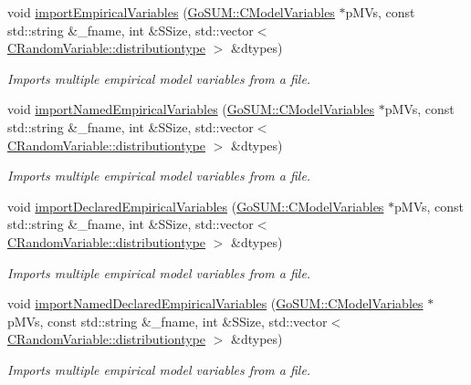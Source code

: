 \begin{DoxyCompactItemize}
void \hyperlink{class_go_s_u_m_1_1_c_container_ae5c4eeb98b818af39fd6956f0cc52757}{import\-Empirical\-Variables} (\hyperlink{class_go_s_u_m_1_1_c_model_variables}{Go\-S\-U\-M\-::\-C\-Model\-Variables} $\ast$p\-M\-Vs, const std\-::string \&\-\_\-fname, int \&S\-Size, std\-::vector$<$ \hyperlink{class_c_random_variable_a80d2a87c43847274138b51f7d713d7f1}{C\-Random\-Variable\-::distributiontype} $>$ \&dtypes)
\begin{DoxyCompactList}\small\item\em Imports multiple empirical model variables from a file. \end{DoxyCompactList}\item 
void \hyperlink{class_go_s_u_m_1_1_c_container_a39d523fa0fc1af3a061f02223fab2b54}{import\-Named\-Empirical\-Variables} (\hyperlink{class_go_s_u_m_1_1_c_model_variables}{Go\-S\-U\-M\-::\-C\-Model\-Variables} $\ast$p\-M\-Vs, const std\-::string \&\-\_\-fname, int \&S\-Size, std\-::vector$<$ \hyperlink{class_c_random_variable_a80d2a87c43847274138b51f7d713d7f1}{C\-Random\-Variable\-::distributiontype} $>$ \&dtypes)
\begin{DoxyCompactList}\small\item\em Imports multiple empirical model variables from a file. \end{DoxyCompactList}\item 
void \hyperlink{class_go_s_u_m_1_1_c_container_a9ed00d0e2231dfd10699de96247e60dc}{import\-Declared\-Empirical\-Variables} (\hyperlink{class_go_s_u_m_1_1_c_model_variables}{Go\-S\-U\-M\-::\-C\-Model\-Variables} $\ast$p\-M\-Vs, const std\-::string \&\-\_\-fname, int \&S\-Size, std\-::vector$<$ \hyperlink{class_c_random_variable_a80d2a87c43847274138b51f7d713d7f1}{C\-Random\-Variable\-::distributiontype} $>$ \&dtypes)
\begin{DoxyCompactList}\small\item\em Imports multiple empirical model variables from a file. \end{DoxyCompactList}\item 
void \hyperlink{class_go_s_u_m_1_1_c_container_a235cad8c3165604a08024d9248d037a2}{import\-Named\-Declared\-Empirical\-Variables} (\hyperlink{class_go_s_u_m_1_1_c_model_variables}{Go\-S\-U\-M\-::\-C\-Model\-Variables} $\ast$p\-M\-Vs, const std\-::string \&\-\_\-fname, int \&S\-Size, std\-::vector$<$ \hyperlink{class_c_random_variable_a80d2a87c43847274138b51f7d713d7f1}{C\-Random\-Variable\-::distributiontype} $>$ \&dtypes)
\begin{DoxyCompactList}\small\item\em Imports multiple empirical model variables from a file. \end{DoxyCompactList}\item 

\end{DoxyCompactItemize}
